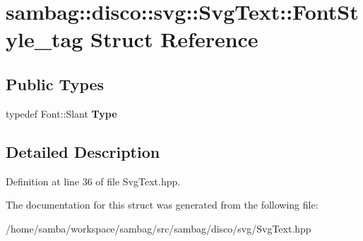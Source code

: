\hypertarget{structsambag_1_1disco_1_1svg_1_1_svg_text_1_1_font_style__tag}{
\section{sambag::disco::svg::SvgText::FontStyle\_\-tag Struct Reference}
\label{structsambag_1_1disco_1_1svg_1_1_svg_text_1_1_font_style__tag}
}
\subsection*{Public Types}
\begin{DoxyCompactItemize}
\item 
\hypertarget{structsambag_1_1disco_1_1svg_1_1_svg_text_1_1_font_style__tag_aebf85804597565c40cbf89d2934a91ab}{
typedef Font::Slant {\bfseries Type}}
\label{structsambag_1_1disco_1_1svg_1_1_svg_text_1_1_font_style__tag_aebf85804597565c40cbf89d2934a91ab}

\end{DoxyCompactItemize}


\subsection{Detailed Description}


Definition at line 36 of file SvgText.hpp.



The documentation for this struct was generated from the following file:\begin{DoxyCompactItemize}
\item 
/home/samba/workspace/sambag/src/sambag/disco/svg/SvgText.hpp\end{DoxyCompactItemize}
